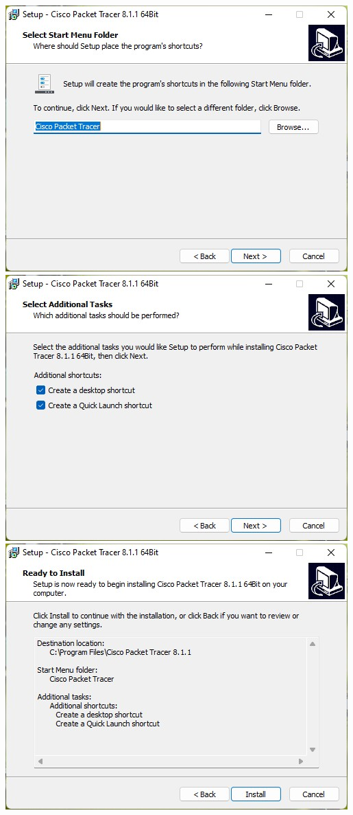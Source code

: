 \documentclass{article}
\begin{document}
\begin{flushleft}
\begin{enumerate}
{                \includegraphics[scale=0.8]{install/3.jpg}
                \includegraphics[scale=0.8]{install/4.jpg}
                \includegraphics[scale=0.8]{install/5.jpg}
}
\end{enumerate}
\end{flushleft}
\end{document}

